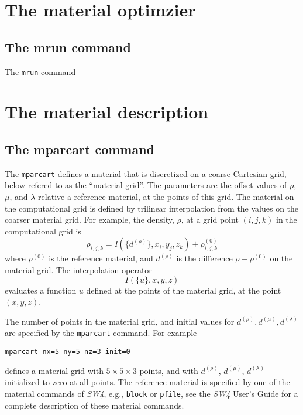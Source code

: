 \documentclass[12pt]{report}
\begin{document}
\chapter{The material optimzier }\label{sec:matopt}

\section{The mrun command}\label{sec:mrundesc}
The \verb+mrun+ command 

\chapter{The material description}\label{sec:matdesc}



\section{The mparcart command}\label{sec:mparcartdesc}

The \verb+mparcart+ defines a material that is discretized on a coarse Cartesian grid, 
below refered to as the ``material grid''. The parameters are the offset values of 
$\rho$, $\mu$, and $\lambda$ relative a reference material, at the points of this grid. 
The material on the computational grid 
is defined by trilinear interpolation from the values on the coarser material grid. 
For example, the density, $\rho$, at a grid point $(i,j,k)$ in the computational grid is 
$$
  \rho_{i,j,k} = I(\{d^{(\rho)}\},x_i,y_j,z_k) + \rho^{(0)}_{i,j,k}
$$
where $\rho^{(0)}$ is the reference material, and $d^{(\rho)}$ is the difference $\rho-\rho^{(0)}$ 
on the material grid. The interpolation operator
$$
 I(\{ u \}, x,y,z)
$$
evaluates a function $u$ defined at the points of the material grid, at the point $(x,y,z)$.
\par
The number of points in the material grid, and initial values for $d^{(\rho)}, d^{(\mu)}, d^{(\lambda)}$
are specified by the \verb+mparcart+ command. For example
\begin{verbatim}
mparcart nx=5 ny=5 nz=3 init=0
\end{verbatim}
defines a material grid with $5\times 5\times 3$ points, and with $d^{(\rho)}$, $d^{(\mu)}$, $d^{(\lambda)}$
initialized to zero at all points.
The reference material is specified by one of the material commands 
of \emph{SW4}, e.g., \verb+block+ or \verb+pfile+, see the \emph{SW4} User's Guide for a
complete description of these material commands.
\end{document}
